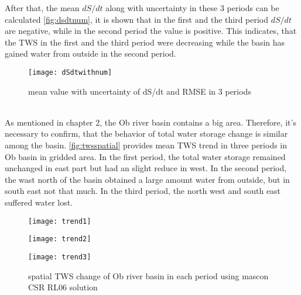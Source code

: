 After that, the mean $dS/dt$ along with uncertainty in these 3 periods can be calculated \autoref{fig:dsdtnum}, it is shown that in the first and the third period $dS/dt$ are negative, while in the second period the value is positive. This indicates, that the TWS in the first and the third period were decreasing while the basin has gained water from outside in the second period.  \\
\begin{figure}[htbp]
	\centering
	\texttt{[image: dSdtwithnum]} 
	\caption{mean value with uncertainty of dS/dt and RMSE in 3 periods} 
	\label{fig:dsdtnum}
\end{figure}\\
As mentioned in chapter 2, the Ob river basin contains a big area. Therefore, it's necessary to confirm, that the behavior of total water storage change is similar among the basin. \autoref{fig:twsspatial} provides mean TWS trend in three periods in Ob basin in gridded area. In the first period, the total water storage remained unchanged in east part but had an slight reduce in west. In the second period, the wast north of the basin obtained a large amount water from outside, but in south east not that much. In the third period, the north west and south east suffered water lost. 
\begin{figure}[htbp]\centering
	\begin{minipage}[t]{0.3\textwidth}
		\centering
		\texttt{[image: trend1]} %
	\end{minipage}
	\begin{minipage}[t]{0.3\textwidth}
		\centering
		\texttt{[image: trend2]} %
	\end{minipage}
	\begin{minipage}[t]{0.3\textwidth}
		\centering
		\texttt{[image: trend3]} %
	\end{minipage}
	\caption{spatial TWS change of Ob river basin in each period using mascon CSR RL06 solution}
	\label{fig:twsspatial}
\end{figure}
